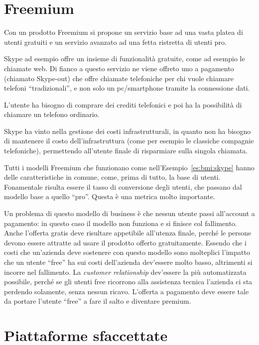 \section{Freemium}

Con un prodotto Freemium si propone un servizio base ad una vasta platea di
utenti gratuiti e un servizio avanzato ad una fetta ristretta di utenti pro.

\begin{example}[Skype]\label{es:bmi:skype}
Skype ad esempio offre un insieme di funzionalità gratuite, come ad esempio le
chiamate web. Di fianco a questo servizio ne viene offreto uno a pagamento
(chiamato Skype-out) che offre chiamate telefoniche per chi vuole chiamare
telefoni ``tradizionali'', e non solo un pc/smartphone tramite la connessione
dati.

\noindent L'utente ha bisogno di comprare dei crediti telefonici e poi ha la
possibilità di chiamare un telefono ordinario.

\noindent Skype ha vinto nella gestione dei costi infrastrutturali, in quanto
non ha bisogno di mantenere il costo dell'infrastruttura (come per esempio le
classiche compagnie telefoniche), permettendo all'utente finale di risparmiare
sulla singola chiamata.
\end{example}

\noindent Tutti i modelli Freemium che funzionano come
nell'Esempio~\ref{es:bmi:skype} hanno delle caratteristiche in comune, come,
prima di tutto, la base di utenti.
Fonamentale risulta essere il tasso di conversione degli utenti, che passano
dal modello base a quello ``pro''. Questa è una metrica molto importante.

Un problema di questo modello di business è che nessun utente passi all'account
a pagamento: in questo caso il modello non funziona e si finisce col
fallimento. Anche l'offerta gratis deve risultare appetibile all'utenza finale,
perché le persone devono essere attratte ad usare il prodotto offerto
gratuitamente. Essendo che i costi che un'azienda deve sostenere con questo
modello sono molteplici l'impatto che un utente ``free'' ha sui costi
dell'azienda dev'essere molto basso, altrimenti si incorre nel fallimento.
La \textit{customer relationship} dev'essere la più automatizzata possibile,
perché se gli utenti free ricorrono alla assistenza tecnica l'azienda ci sta
perdendo solamente, senza nessun ricavo.
L'offerta a pagamento deve essere tale da portare l'utente ``free'' a fare il
salto e diventare premium.

\section{Piattaforme sfaccettate}

